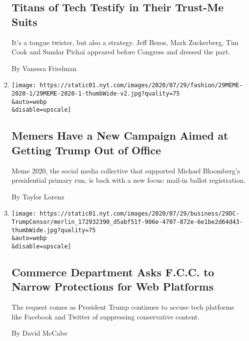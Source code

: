 \begin{enumerate}
{  \subsection{Titans of Tech Testify in Their Trust-Me
  Suits}\label{titans-of-tech-testify-in-their-trust-me-suits}}

  It's a tongue twister, but also a strategy. Jeff Bezos, Mark
  Zuckerberg, Tim Cook and Sundar Pichai appeared before Congress and
  dressed the part.

  By Vanessa Friedman
\item
  \href{/2020/07/29/style/meme-2020-lincoln-project-election.html}{}

  \texttt{[image: https://static01.nyt.com/images/2020/07/29/fashion/29MEME-2020-1/29MEME-2020-1-thumbWide-v2.jpg?quality=75\\\&auto=webp\\\&disable=upscale]}

  \hypertarget{memers-have-a-new-campaign-aimed-at-getting-trump-out-of-office}{%
  \subsection{Memers Have a New Campaign Aimed at Getting Trump Out of
  Office}\label{memers-have-a-new-campaign-aimed-at-getting-trump-out-of-office}}

  Meme 2020, the social media collective that supported Michael
  Bloomberg's presidential primary run, is back with a new focus:
  mail-in ballot registration.

  By Taylor Lorenz
\item
  \href{/2020/07/29/technology/trump-fcc-twitter-facebook.html}{}

  \texttt{[image: https://static01.nyt.com/images/2020/07/29/business/29DC-TrumpCensor/merlin\_172932390\_d5abf51f-906e-4707-872e-6e1be2d64d43-thumbWide.jpg?quality=75\\\&auto=webp\\\&disable=upscale]}

  \hypertarget{commerce-department-asks-fcc-to-narrow-protections-for-web-platforms}{%
  \subsection{Commerce Department Asks F.C.C. to Narrow Protections for
  Web
  Platforms}\label{commerce-department-asks-fcc-to-narrow-protections-for-web-platforms}}

  The request comes as President Trump continues to accuse tech
  platforms like Facebook and Twitter of suppressing conservative
  content.

  By David McCabe
\end{enumerate}

